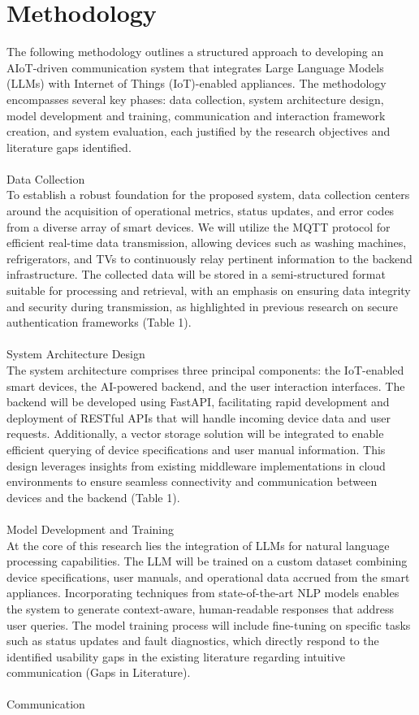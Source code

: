 \documentclass[conference]{IEEEtran}
\begin{document}
\section{Methodology}
\hspace{}The following methodology outlines a structured approach to developing an AIoT-driven communication system that integrates Large Language Models (LLMs) with Internet of Things (IoT)-enabled appliances. The methodology encompasses several key phases: data collection, system architecture design, model development and training, communication and interaction framework creation, and system evaluation, each justified by the research objectives and literature gaps identified.\\\\Data Collection\\To establish a robust foundation for the proposed system, data collection centers around the acquisition of operational metrics, status updates, and error codes from a diverse array of smart devices. We will utilize the MQTT protocol for efficient real-time data transmission, allowing devices such as washing machines, refrigerators, and TVs to continuously relay pertinent information to the backend infrastructure. The collected data will be stored in a semi-structured format suitable for processing and retrieval, with an emphasis on ensuring data integrity and security during transmission, as highlighted in previous research on secure authentication frameworks (Table 1).\\\\System Architecture Design\\The system architecture comprises three principal components: the IoT-enabled smart devices, the AI-powered backend, and the user interaction interfaces. The backend will be developed using FastAPI, facilitating rapid development and deployment of RESTful APIs that will handle incoming device data and user requests. Additionally, a vector storage solution will be integrated to enable efficient querying of device specifications and user manual information. This design leverages insights from existing middleware implementations in cloud environments to ensure seamless connectivity and communication between devices and the backend (Table 1).\\\\Model Development and Training\\At the core of this research lies the integration of LLMs for natural language processing capabilities. The LLM will be trained on a custom dataset combining device specifications, user manuals, and operational data accrued from the smart appliances. Incorporating techniques from state-of-the-art NLP models enables the system to generate context-aware, human-readable responses that address user queries. The model training process will include fine-tuning on specific tasks such as status updates and fault diagnostics, which directly respond to the identified usability gaps in the existing literature regarding intuitive communication (Gaps in Literature).\\\\Communication 
\end{document}

